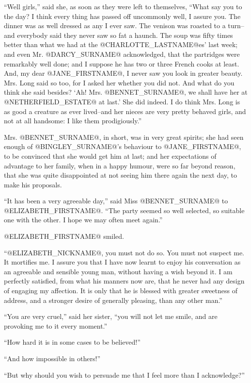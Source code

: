 ``Well girls,'' said she, as soon as they were left to themselves, ``What
say you to the day? I think every thing has passed off uncommonly well,
I assure you. The dinner was as well dressed as any I ever saw. The
venison was roasted to a turn--and everybody said they never saw so
fat a haunch. The soup was fifty times better than what we had at the
@CHARLOTTE_LASTNAME@es' last week; and even Mr. @DARCY_SURNAME@ acknowledged, that the partridges
were remarkably well done; and I suppose he has two or three French
cooks at least. And, my dear @JANE_FIRSTNAME@, I never saw you look in greater
beauty. Mrs. Long said so too, for I asked her whether you did not. And
what do you think she said besides? `Ah! Mrs. @BENNET_SURNAME@, we shall have her
at @NETHERFIELD_ESTATE@ at last.' She did indeed. I do think Mrs. Long is as good
a creature as ever lived--and her nieces are very pretty behaved girls,
and not at all handsome: I like them prodigiously.''

Mrs. @BENNET_SURNAME@, in short, was in very great spirits; she had seen enough of
@BINGLEY_SURNAME@'s behaviour to @JANE_FIRSTNAME@, to be convinced that she would get him at
last; and her expectations of advantage to her family, when in a happy
humour, were so far beyond reason, that she was quite disappointed at
not seeing him there again the next day, to make his proposals.

``It has been a very agreeable day,'' said Miss @BENNET_SURNAME@ to @ELIZABETH_FIRSTNAME@. ``The
party seemed so well selected, so suitable one with the other. I hope we
may often meet again.''

@ELIZABETH_FIRSTNAME@ smiled.

``@ELIZABETH_NICKNAME@, you must not do so. You must not suspect me. It mortifies me.
I assure you that I have now learnt to enjoy his conversation as an
agreeable and sensible young man, without having a wish beyond it. I am
perfectly satisfied, from what his manners now are, that he never had
any design of engaging my affection. It is only that he is blessed
with greater sweetness of address, and a stronger desire of generally
pleasing, than any other man.''

``You are very cruel,'' said her sister, ``you will not let me smile, and
are provoking me to it every moment.''

``How hard it is in some cases to be believed!''

``And how impossible in others!''

``But why should you wish to persuade me that I feel more than I
acknowledge?''

